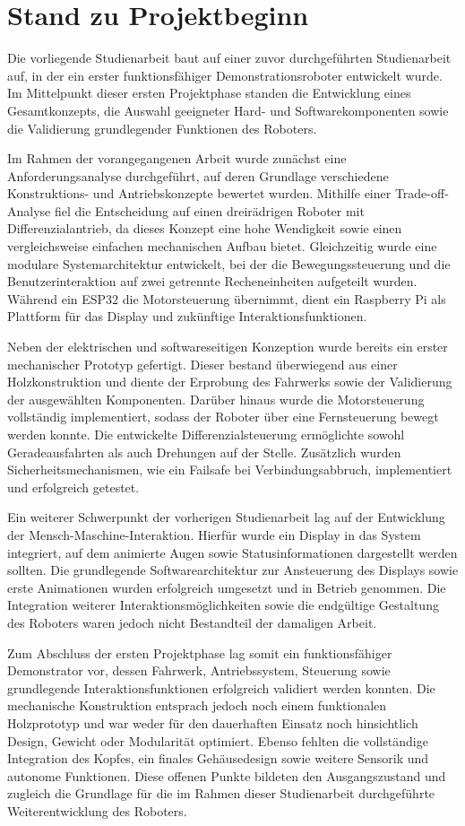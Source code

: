 \section{Stand zu Projektbeginn}
\label{sec:Projektbeginn}

Die vorliegende Studienarbeit baut auf einer zuvor durchgeführten Studienarbeit auf, in der ein erster funktionsfähiger Demonstrationsroboter entwickelt wurde.
Im Mittelpunkt dieser ersten Projektphase standen die Entwicklung eines Gesamtkonzepts, die Auswahl geeigneter Hard- und Softwarekomponenten sowie die Validierung grundlegender Funktionen des Roboters. \cite{Hadutoglu2026}

Im Rahmen der vorangegangenen Arbeit wurde zunächst eine Anforderungsanalyse durchgeführt, auf deren Grundlage verschiedene Konstruktions- und Antriebskonzepte bewertet wurden. Mithilfe einer Trade-off-Analyse fiel die Entscheidung auf einen dreirädrigen Roboter mit Differenzialantrieb, da dieses Konzept eine hohe Wendigkeit sowie einen vergleichsweise einfachen mechanischen Aufbau bietet. Gleichzeitig wurde eine modulare Systemarchitektur entwickelt, bei der die Bewegungssteuerung und die Benutzerinteraktion auf zwei getrennte Recheneinheiten aufgeteilt wurden. Während ein ESP32 die Motorsteuerung übernimmt, dient ein Raspberry Pi als Plattform für das Display und zukünftige Interaktionsfunktionen.  

Neben der elektrischen und softwareseitigen Konzeption wurde bereits ein erster mechanischer Prototyp gefertigt. Dieser bestand überwiegend aus einer Holzkonstruktion und diente der Erprobung des Fahrwerks sowie der Validierung der ausgewählten Komponenten. Darüber hinaus wurde die Motorsteuerung vollständig implementiert, sodass der Roboter über eine Fernsteuerung bewegt werden konnte. Die entwickelte Differenzialsteuerung ermöglichte sowohl Geradeausfahrten als auch Drehungen auf der Stelle. Zusätzlich wurden Sicherheitsmechanismen, wie ein Failsafe bei Verbindungsabbruch, implementiert und erfolgreich getestet.  

Ein weiterer Schwerpunkt der vorherigen Studienarbeit lag auf der Entwicklung der Mensch-Maschine-Interaktion. Hierfür wurde ein Display in das System integriert, auf dem animierte Augen sowie Statusinformationen dargestellt werden sollten. Die grundlegende Softwarearchitektur zur Ansteuerung des Displays sowie erste Animationen wurden erfolgreich umgesetzt und in Betrieb genommen. Die Integration weiterer Interaktionsmöglichkeiten sowie die endgültige Gestaltung des Roboters waren jedoch nicht Bestandteil der damaligen Arbeit.  

Zum Abschluss der ersten Projektphase lag somit ein funktionsfähiger Demonstrator vor, dessen Fahrwerk, Antriebssystem, Steuerung sowie grundlegende Interaktionsfunktionen erfolgreich validiert werden konnten. Die mechanische Konstruktion entsprach jedoch noch einem funktionalen Holzprototyp und war weder für den dauerhaften Einsatz noch hinsichtlich Design, Gewicht oder Modularität optimiert. Ebenso fehlten die vollständige Integration des Kopfes, ein finales Gehäusedesign sowie weitere Sensorik und autonome Funktionen. Diese offenen Punkte bildeten den Ausgangszustand und zugleich die Grundlage für die im Rahmen dieser Studienarbeit durchgeführte Weiterentwicklung des Roboters.  